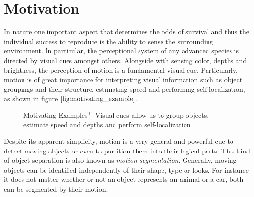 \section{Motivation}
In nature one important aspect that determines the odds of survival and thus the individual success to reproduce is the ability to sense the surrounding environment. In particular, the perceptional system of any advanced species is directed by visual cues amongst others. Alongside with sensing color, depths and brightness, the perception of motion is a fundamental visual cue. Particularly, motion is of great importance for interpreting visual information such as object groupings and their structure, estimating speed and performing self-localization, as shown in figure $\ref{fig:motivating_example}$.
\begin{figure}[H]
\begin{center}
\end{center}
\caption[Motivating Example]{Motivating Examples$\footnotemark$: Visual cues allow us to group objects, estimate speed and depths and perform self-localization}
\label{fig:motivating_example}
\end{figure}
Despite its apparent simplicity, motion is a very general and powerful cue to detect moving objects or even to partition them into their logical parts. This kind of object separation is also known as \textit{motion segmentation}. Generally, moving objects can be identified independently of their shape, type or looks. For instance it does not matter whether or not an object represents an animal or a car, both can be segmented by their motion. \\ \\
